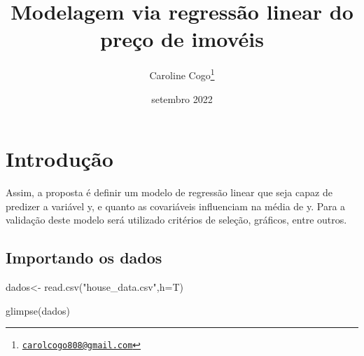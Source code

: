 \documentclass[
]{article}
\title{Modelagem via regressão linear do preço de imovéis}
\author{Caroline Cogo\footnote{\href{mailto:carolcogo808@gmail.com}{\nolinkurl{carolcogo808@gmail.com}}}}
\date{setembro 2022}
\newenvironment{Shaded}{\begin{snugshade}}{\end{snugshade}}
\newcommand{\AttributeTok}[1]{\textcolor[rgb]{0.77,0.63,0.00}{#1}}
\newcommand{\FunctionTok}[1]{\textcolor[rgb]{0.00,0.00,0.00}{#1}}
\newcommand{\NormalTok}[1]{#1}
\newcommand{\OtherTok}[1]{\textcolor[rgb]{0.56,0.35,0.01}{#1}}
\newcommand{\StringTok}[1]{\textcolor[rgb]{0.31,0.60,0.02}{#1}}
\begin{document}
\maketitle

{
\setcounter{tocdepth}{2}
\tableofcontents
}
\clearpage

\hypertarget{introduuxe7uxe3o}{%
\section{Introdução}\label{introduuxe7uxe3o}}

Assim, a proposta é definir um modelo de regressão linear que seja capaz de predizer a variável y, e quanto as covariáveis influenciam na média de y. Para a validação deste modelo será utilizado critérios de seleção, gráficos, entre outros.

\hypertarget{importando-os-dados}{%
\subsection{Importando os dados}\label{importando-os-dados}}

\begin{Shaded}
\begin{Highlighting}[]
\NormalTok{dados}\OtherTok{\textless{}{-}} \FunctionTok{read.csv}\NormalTok{(}\StringTok{"house\_data.csv"}\NormalTok{,}\AttributeTok{h=}\NormalTok{T) }

\FunctionTok{glimpse}\NormalTok{(dados)}
\end{Highlighting}
\end{Shaded}
\end{document}
